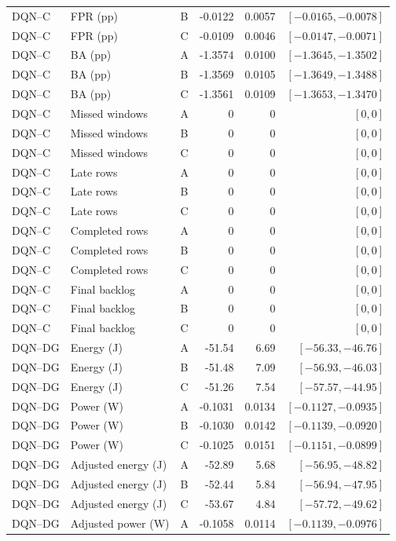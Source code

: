 \begin{longtable}{lllrrr}
DQN--C & FPR (pp) & B & -0.0122 & 0.0057 & $[-0.0165,-0.0078]$\\
DQN--C & FPR (pp) & C & -0.0109 & 0.0046 & $[-0.0147,-0.0071]$\\
DQN--C & BA (pp) & A & -1.3574 & 0.0100 & $[-1.3645,-1.3502]$\\
DQN--C & BA (pp) & B & -1.3569 & 0.0105 & $[-1.3649,-1.3488]$\\
DQN--C & BA (pp) & C & -1.3561 & 0.0109 & $[-1.3653,-1.3470]$\\
DQN--C & Missed windows & A & 0 & 0 & $[0,0]$\\
DQN--C & Missed windows & B & 0 & 0 & $[0,0]$\\
DQN--C & Missed windows & C & 0 & 0 & $[0,0]$\\
DQN--C & Late rows & A & 0 & 0 & $[0,0]$\\
DQN--C & Late rows & B & 0 & 0 & $[0,0]$\\
DQN--C & Late rows & C & 0 & 0 & $[0,0]$\\
DQN--C & Completed rows & A & 0 & 0 & $[0,0]$\\
DQN--C & Completed rows & B & 0 & 0 & $[0,0]$\\
DQN--C & Completed rows & C & 0 & 0 & $[0,0]$\\
DQN--C & Final backlog & A & 0 & 0 & $[0,0]$\\
DQN--C & Final backlog & B & 0 & 0 & $[0,0]$\\
DQN--C & Final backlog & C & 0 & 0 & $[0,0]$\\
DQN--DG & Energy (J) & A & -51.54 & 6.69 & $[-56.33,-46.76]$\\
DQN--DG & Energy (J) & B & -51.48 & 7.09 & $[-56.93,-46.03]$\\
DQN--DG & Energy (J) & C & -51.26 & 7.54 & $[-57.57,-44.95]$\\
DQN--DG & Power (W) & A & -0.1031 & 0.0134 & $[-0.1127,-0.0935]$\\
DQN--DG & Power (W) & B & -0.1030 & 0.0142 & $[-0.1139,-0.0920]$\\
DQN--DG & Power (W) & C & -0.1025 & 0.0151 & $[-0.1151,-0.0899]$\\
DQN--DG & Adjusted energy (J) & A & -52.89 & 5.68 & $[-56.95,-48.82]$\\
DQN--DG & Adjusted energy (J) & B & -52.44 & 5.84 & $[-56.94,-47.95]$\\
DQN--DG & Adjusted energy (J) & C & -53.67 & 4.84 & $[-57.72,-49.62]$\\
DQN--DG & Adjusted power (W) & A & -0.1058 & 0.0114 & $[-0.1139,-0.0976]$\\

\end{longtable}
